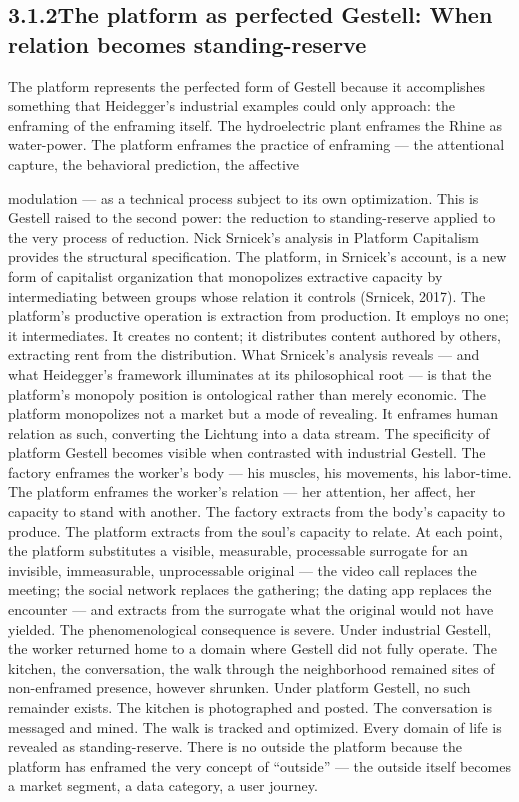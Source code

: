 \subsection{3.1.2\quad The platform as perfected Gestell: When relation becomes standing-reserve}

The platform represents the perfected form of Gestell because it accomplishes something that Heidegger’s industrial examples could only approach: the enframing of the enframing itself. The hydroelectric plant enframes the Rhine as water-power. The platform enframes the practice of enframing — the attentional capture, the behavioral prediction, the affective

modulation — as a technical process subject to its own optimization. This is Gestell raised to the second power: the reduction to standing-reserve applied to the very process of reduction. Nick Srnicek’s analysis in Platform Capitalism provides the structural specification. The platform, in Srnicek’s account, is a new form of capitalist organization that monopolizes extractive capacity by intermediating between groups whose relation it controls (Srnicek, 2017). The platform’s productive operation is extraction from production. It employs no one; it intermediates. It creates no content; it distributes content authored by others, extracting rent from the distribution. What Srnicek’s analysis reveals — and what Heidegger’s framework illuminates at its philosophical root — is that the platform’s monopoly position is ontological rather than merely economic. The platform monopolizes not a market but a mode of revealing. It enframes human relation as such, converting the Lichtung into a data stream. The specificity of platform Gestell becomes visible when contrasted with industrial Gestell. The factory enframes the worker’s body — his muscles, his movements, his labor-time. The platform enframes the worker’s relation — her attention, her affect, her capacity to stand with another. The factory extracts from the body’s capacity to produce. The platform extracts from the soul’s capacity to relate. At each point, the platform substitutes a visible, measurable, processable surrogate for an invisible, immeasurable, unprocessable original — the video call replaces the meeting; the social network replaces the gathering; the dating app replaces the encounter — and extracts from the surrogate what the original would not have yielded. The phenomenological consequence is severe. Under industrial Gestell, the worker returned home to a domain where Gestell did not fully operate. The kitchen, the conversation, the walk through the neighborhood remained sites of non-enframed presence, however shrunken. Under platform Gestell, no such remainder exists. The kitchen is photographed and posted. The conversation is messaged and mined. The walk is tracked and optimized. Every domain of life is revealed as standing-reserve. There is no outside the platform because the platform has enframed the very concept of “outside” — the outside itself becomes a market segment, a data category, a user journey.


